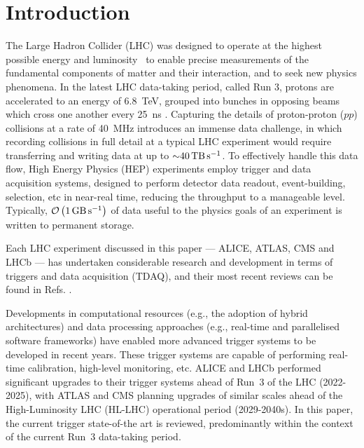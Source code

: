 \section{Introduction}


The Large Hadron Collider (LHC) was designed to operate at the highest possible energy and luminosity~\cite{CERN:lhc-design-report} to enable precise measurements of the fundamental components of matter and their interaction, and to seek new physics phenomena. 
In the latest LHC data-taking period, called Run 3, protons are accelerated to an energy of \SI{6.8}{\tera\electronvolt}, grouped into bunches in opposing beams which cross one another every \SI{25}{\nano\second} \cite{CERN:lhc-run3-operation}. 
Capturing the details of proton-proton ($pp$) collisions at a rate of \SI{40}{\mega\hertz} introduces an immense data challenge, in which recording collisions in full detail at a typical LHC experiment would require transferring and writing data at up to ${\sim}\SI{40}{\tera\byte\per\second}$. 
To effectively handle this data flow, High Energy Physics (HEP) experiments employ trigger and data acquisition systems, designed to perform detector data readout, event-building, selection, etc in near-real time, reducing the throughput to a manageable level. Typically, $\mathcal{O}\left(\SI{1}{\giga\byte\per\second}\right)$ of data useful to the physics goals of an experiment is written to permanent storage.

Each LHC experiment discussed in this paper — ALICE, ATLAS, CMS and LHCb — has undertaken considerable research and development in terms of triggers and data acquisition (TDAQ), and their most recent reviews can be found in Refs. \cite{ATLASTriggerRun3}. 

Developments in computational resources (e.g., the adoption of hybrid architectures) and data processing approaches (e.g., real-time and parallelised software frameworks) have enabled more advanced trigger systems to be developed in recent years. These trigger systems are capable of performing real-time calibration, high-level monitoring, etc. ALICE and LHCb performed significant upgrades to their trigger systems ahead of Run~3 of the LHC (2022-2025), with ATLAS and CMS planning upgrades of similar scales ahead of the High-Luminosity LHC (HL-LHC) operational period (2029-2040s). 
In this paper, the current trigger state-of-the art is reviewed, predominantly within the context of the current Run~3 data-taking period.

